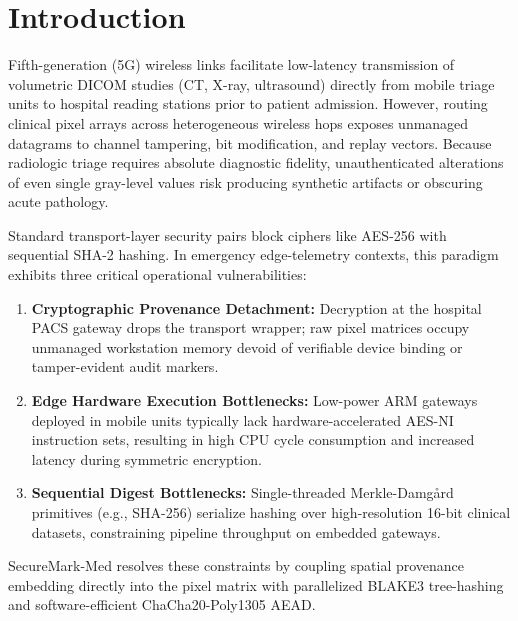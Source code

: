 \documentclass[runningheads]{llncs}
\begin{document}
\section{Introduction}

Fifth-generation (5G) wireless links facilitate low-latency transmission of volumetric DICOM studies (CT, X-ray, ultrasound) directly from mobile triage units to hospital reading stations prior to patient admission. However, routing clinical pixel arrays across heterogeneous wireless hops exposes unmanaged datagrams to channel tampering, bit modification, and replay vectors. Because radiologic triage requires absolute diagnostic fidelity, unauthenticated alterations of even single gray-level values risk producing synthetic artifacts or obscuring acute pathology.

Standard transport-layer security pairs block ciphers like AES-256 with sequential SHA-2 hashing. In emergency edge-telemetry contexts, this paradigm exhibits three critical operational vulnerabilities:
\begin{enumerate}
  \item \textbf{Cryptographic Provenance Detachment:} Decryption at the hospital PACS gateway drops the transport wrapper; raw pixel matrices occupy unmanaged workstation memory devoid of verifiable device binding or tamper-evident audit markers.
  \item \textbf{Edge Hardware Execution Bottlenecks:} Low-power ARM gateways deployed in mobile units typically lack hardware-accelerated AES-NI instruction sets, resulting in high CPU cycle consumption and increased latency during symmetric encryption.
  \item \textbf{Sequential Digest Bottlenecks:} Single-threaded Merkle-Damgård primitives (e.g., SHA-256) serialize hashing over high-resolution 16-bit clinical datasets, constraining pipeline throughput on embedded gateways.
\end{enumerate}

SecureMark-Med resolves these constraints by coupling spatial provenance embedding directly into the pixel matrix with parallelized BLAKE3 tree-hashing and software-efficient ChaCha20-Poly1305 AEAD.
\end{document}
